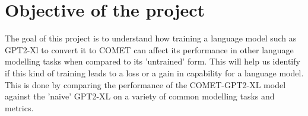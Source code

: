 \documentclass[\main/thesis.tex]{subfiles}
\begin{document}
\chapter{Objective of the project}

The goal of this project is to understand how training a language model such as GPT2-Xl 
to convert it to COMET can affect its performance in other language modelling tasks when
compared to its 'untrained' form. This will help us identify if this kind of training leads
to a loss or a gain in capability for a language model.
This is done by comparing the performance of the COMET-GPT2-XL model against the 'naive' GPT2-XL 
on a variety of common modelling tasks and metrics. 
\end{document}
